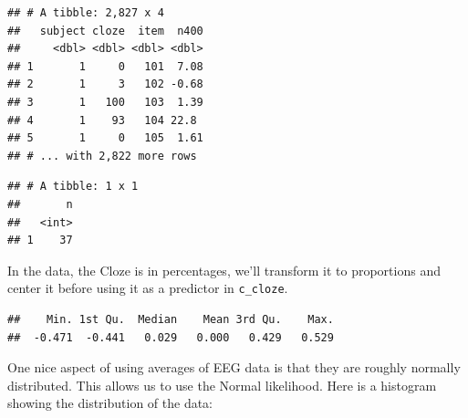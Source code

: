 \documentclass[12pt,]{krantz}
\newenvironment{Shaded}{\begin{snugshade}}{\end{snugshade}}
\newcommand{\CommentTok}[1]{\textcolor[rgb]{0.56,0.35,0.01}{\textit{#1}}}
\newcommand{\DataTypeTok}[1]{\textcolor[rgb]{0.13,0.29,0.53}{#1}}
\newcommand{\DecValTok}[1]{\textcolor[rgb]{0.00,0.00,0.81}{#1}}
\newcommand{\KeywordTok}[1]{\textcolor[rgb]{0.13,0.29,0.53}{\textbf{#1}}}
\newcommand{\NormalTok}[1]{#1}
\newcommand{\OperatorTok}[1]{\textcolor[rgb]{0.81,0.36,0.00}{\textbf{#1}}}
\newcommand{\StringTok}[1]{\textcolor[rgb]{0.31,0.60,0.02}{#1}}
\theoremstyle{definition}
\theoremstyle{definition}
\theoremstyle{definition}
\theoremstyle{remark}
\begin{document}
\begin{verbatim}
## # A tibble: 2,827 x 4
##   subject cloze  item  n400
##     <dbl> <dbl> <dbl> <dbl>
## 1       1     0   101  7.08
## 2       1     3   102 -0.68
## 3       1   100   103  1.39
## 4       1    93   104 22.8 
## 5       1     0   105  1.61
## # ... with 2,822 more rows
\end{verbatim}

\begin{Shaded}
\end{Shaded}

\begin{verbatim}
## # A tibble: 1 x 1
##       n
##   <int>
## 1    37
\end{verbatim}

In the data, the Cloze is in percentages, we'll transform it to proportions and center it before using it as a predictor in \texttt{c\_cloze}.

\begin{Shaded}
\end{Shaded}

\begin{verbatim}
##    Min. 1st Qu.  Median    Mean 3rd Qu.    Max. 
##  -0.471  -0.441   0.029   0.000   0.429   0.529
\end{verbatim}

One nice aspect of using averages of EEG data is that they are roughly normally distributed. This allows us to use the Normal likelihood. Here is a histogram showing the distribution of the data:
\end{document}
